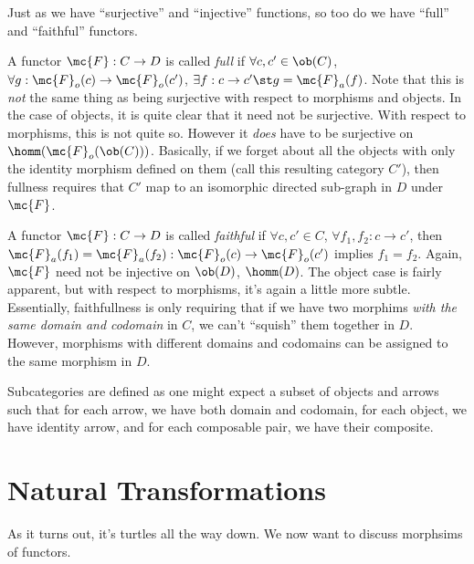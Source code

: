\documentclass{fkbook}
\theoremstyle{snazzydefinition}
\begin{document}
Just as we have ``surjective'' and ``injective'' functions, so too do
we have ``full'' and ``faithful'' functors.\\

\begin{definition}
  A functor $\mc{F} : C \to D$ is called \emph{full} if $\forall c,c'
  \in \ob(C)$, $\forall g : \mc{F}_o(c) \to \mc{F}_o(c')$, $\exists f
  : c \to c' \st g = \mc{F}_a(f)$. Note that this is \emph{not} the
  same thing as being surjective with respect to morphisms and
  objects. In the case of objects, it is quite clear that it need not
  be surjective. With respect to morphisms, this is not quite so.
  However it \emph{does} have to be surjective on
  $\homm(\mc{F}_o(\ob(C)))$. Basically, if we forget about all the
  objects with only the identity morphism defined on them (call this
  resulting category $C'$), then fullness requires that $C'$ map to an
  isomorphic directed sub-graph in $D$ under $\mc{F}$.\\
\end{definition}

\begin{definition}
  A functor $\mc{F} : C \to D$ is called \emph{faithful} if $\forall
  c, c' \in C$, $\forall f_1, f_2 : c \to c'$, then $\mc{F}_a(f_1) =
  \mc{F}_a(f_2) : \mc{F}_o(c) \to \mc{F}_o(c')$ implies $f_1 = f_2$.
  Again, $\mc{F}$ need not be injective on $\ob(D)$, $\homm(D)$. The
  object case is fairly apparent, but with respect to morphisms, it's
  again a little more subtle. Essentially, faithfullness is only
  requiring that if we have two morphims \emph{with the same domain
    and codomain} in $C$, we can't ``squish'' them together in $D$.
  However, morphisms with different domains and codomains can be
  assigned to the same morphism in $D$.
\end{definition}

\begin{definition}
  Subcategories are defined as one might expect a subset of objects
  and arrows such that for each arrow, we have both domain and
  codomain, for each object, we have identity arrow, and for each
  composable pair, we have their composite.
\end{definition}

\section{Natural Transformations}
As it turns out, it's turtles all the way down. We now want to discuss
morphsims of functors.
\end{document}
